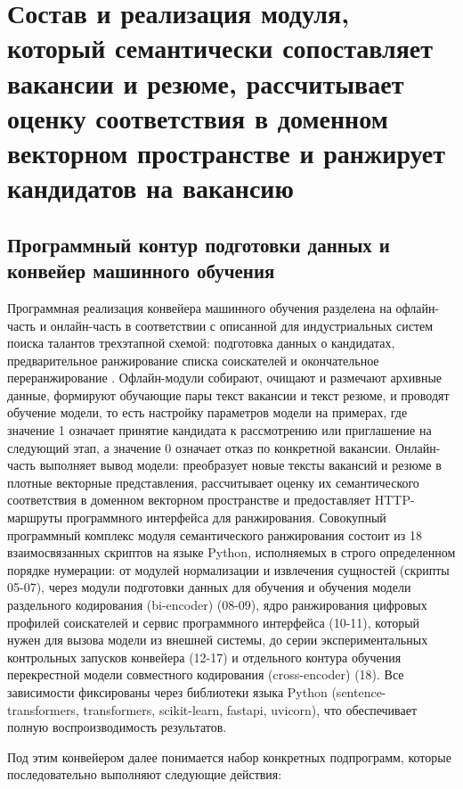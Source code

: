 \chapter{Состав и реализация модуля, который семантически сопоставляет вакансии и резюме, рассчитывает оценку соответствия в доменном векторном пространстве и ранжирует кандидатов на вакансию}
\label{chapter:impl}
\section{Программный контур подготовки данных и конвейер машинного обучения}
Программная реализация конвейера машинного обучения разделена на офлайн-часть и онлайн-часть в соответствии с описанной для индустриальных систем поиска талантов трехэтапной схемой: подготовка данных о кандидатах, предварительное ранжирование списка соискателей и окончательное переранжирование \cite{src17}. Офлайн-модули собирают, очищают и размечают архивные данные, формируют обучающие пары текст вакансии и текст резюме, и проводят обучение модели, то есть настройку параметров модели на примерах, где значение 1 означает принятие кандидата к рассмотрению или приглашение на следующий этап, а значение 0 означает отказ по конкретной вакансии. Онлайн-часть выполняет вывод модели: преобразует новые тексты вакансий и резюме в плотные векторные представления, рассчитывает оценку их семантического соответствия в доменном векторном пространстве и предоставляет HTTP-маршруты программного интерфейса для ранжирования. Совокупный программный комплекс модуля семантического ранжирования состоит из 18 взаимосвязанных скриптов на языке Python, исполняемых в строго определенном порядке нумерации: от модулей нормализации и извлечения сущностей (скрипты 05-07), через модули подготовки данных для обучения и обучения модели раздельного кодирования (bi-encoder) (08-09), ядро ранжирования цифровых профилей соискателей и сервис программного интерфейса (10-11), который нужен для вызова модели из внешней системы, до серии экспериментальных контрольных запусков конвейера (12-17) и отдельного контура обучения перекрестной модели совместного кодирования (cross-encoder) (18). Все зависимости фиксированы через библиотеки языка Python (sentence-transformers, transformers, scikit-learn, fastapi, uvicorn), что обеспечивает полную воспроизводимость результатов.\par
Под этим конвейером далее понимается набор конкретных подпрограмм, которые последовательно выполняют следующие действия:\par
